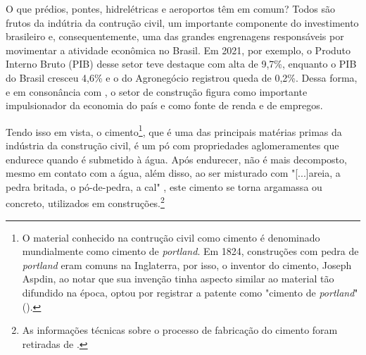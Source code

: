 


\label{cap:introducao}

\enlargethispage{.5\baselineskip}

O que prédios, pontes, hidrelétricas e aeroportos têm em 
comum? Todos são frutos da indútria da contrução civil, 
um importante componente do investimento brasileiro e, 
consequentemente, uma das grandes engrenagens responsáveis 
por movimentar a atividade econômica no Brasil. Em 2021, 
por exemplo, o Produto Interno Bruto (PIB) desse setor 
teve destaque com alta de 9,7\%, enquanto o PIB do Brasil cresceu 
4,6\% e o do Agronegócio registrou queda de 0,2\%. Dessa 
forma, e em consonância com \citet{cbic-report}, o setor de construção figura como importante 
impulsionador da economia do país e como fonte de renda e de
empregos.

Tendo isso em vista, o cimento\footnote{O material conhecido na contrução 
civil como cimento é denominado mundialmente como cimento de 
\textit{portland}. Em 1824, construções com pedra de \textit{portland} eram 
comuns na Inglaterra, por isso, o inventor do cimento, Joseph
Aspdin, ao notar que sua invenção tinha aspecto similar ao 
material tão difundido na época, optou por registrar a patente
como "cimento de \textit{portland}" (\cite{boletim-cimento}).}, que é uma das principais matérias
primas da indústria da construção civil, é 
um pó com propriedades aglomeramentes que endurece quando é 
submetido à água. Após endurecer, não é 
mais decomposto, mesmo em contato com a água, além disso,
ao ser misturado com "[...]areia, a pedra britada, o pó-de-pedra, a cal" 
\citet{boletim-cimento}, este cimento se torna argamassa ou
concreto, utilizados em construções.\footnote{As informações técnicas sobre o processo de fabricação do cimento foram retiradas de \cite{boletim-cimento}.}

